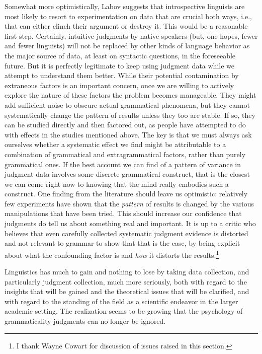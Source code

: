  Somewhat more optimistically, Labov suggests that introspective linguists are most likely to resort to experimentation on data that are crucial both ways, i.e., that can either clinch their argument or destroy it. This would be a reasonable first step. Certainly, intuitive judgments by native speakers (but, one hopes, fewer and fewer linguists) will not be replaced by other kinds of language behavior as the
 major source of data, at least on syntactic questions, in the foreseeable future. But it is perfectly legitimate to keep using judgment data while we attempt to understand them better. While their potential contamination by extraneous factors is an important concern, once we are willing to actively explore the nature of these factors the problem becomes manageable. They might add sufficient noise to obscure actual grammatical phenomena, but they cannot systematically change the pattern of results unless they too are stable. If so, they can be studied directly and then factored out, as people have attempted to do with  effects in the studies mentioned above. The key is that we must always ask ourselves whether a systematic effect we find might be attributable to a combination of grammatical and extragrammatical factors, rather than purely grammatical ones. If the best account we can find of a pattern of variance in judgment data involves some discrete grammatical construct, that is the closest we can come right now to knowing that the mind really embodies such a construct. One finding from the literature should leave us optimistic: relatively few experiments have shown that the \textit{pattern} of results is changed by the various manipulations that have been tried. This should increase our confidence that judgments do tell us about something real and important. It is up to a critic who believes that even carefully collected systematic judgment evidence is distorted and not relevant to grammar to show that that is the case, by being explicit about what the confounding factor is and \textit{how} it distorts the results.\footnote{I thank Wayne Cowart for discussion of issues raised in this section.}


 Linguistics has much to gain and nothing to lose by taking data collection, and particularly judgment collection, much more seriously, both with regard to the insights that will be gained and the theoretical issues that will be clarified, and with regard to the standing of the field as a scientific endeavor in the larger academic setting. The realization seems to be growing that the psychology of grammaticality judgments can no longer be ignored.


